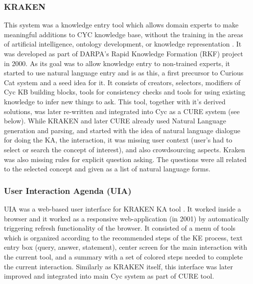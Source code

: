 \subsubsection{KRAKEN}
\label{section:r:kraken}
This system was a knowledge entry tool which allows domain experts to
make meaningful additions to CYC knowledge base, without the training in the 
areas of artificial intelligence, ontology development, or knowledge
representation \parencite{Panton2002a}. It was developed as part of DARPA's
Rapid Knowledge Formation (RKF) project in 2000. As its goal was to allow
knowledge entry to non-trained experts, it started to use natural language 
entry and is as this, a first precursor to Curious Cat system and a seed idea
for it. It consists of creators, selectors, modifiers of Cyc KB building blocks,
tools for consistency checks and tools for using existing knowledge to infer new
things to ask. This tool, together with it's derived solutions, was later 
re-written and integrated into Cyc as a CURE system (see below). While KRAKEN and
later CURE already used Natural Language generation and parsing, and started 
with the idea of natural language dialogue for doing the KA, the interaction, it
was missing user context (user's had to select or search the concept of 
interest), and also crowdsourcing aspects. Kraken was also missing rules for
explicit question asking. The questions were all related to the selected concept
and given as a list of natural language forms.


\subsubsection{User Interaction Agenda (UIA)} 
\label{section:r:uia}
UIA was a web-based user interface for KRAKEN
KA tool \parencite{Panton2002a,Witbrock2003UIA}. It worked inside a browser and 
it worked as a responsive web-application (in 2001) by automatically triggering refresh 
functionality of the browser. It consisted of a menu of tools which is organized
according to the recommended steps of the KE process, text entry box (query, 
answer, statement), center screen for the main interaction with the current 
tool, and a summary with a set of colored steps needed to complete the current 
interaction. Similarly as KRAKEN itself, this interface was later improved
and integrated into main Cyc system as part of CURE tool. 

